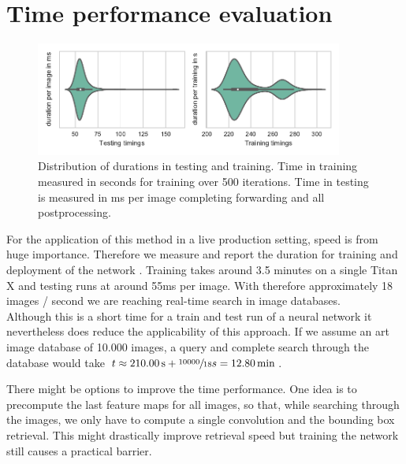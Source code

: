 \section{Time performance evaluation}
\label{sec:results:time}
\begin{figure}[h!]
  \centering
  \includegraphics[width=0.9\textwidth]{figures/timings_fig}
  \caption{Distribution of durations in testing and training. Time in training measured in seconds for training over 500 iterations. Time in testing is measured in ms per image completing forwarding and all postprocessing.}
  \label{fig:timings}
\end{figure}
For the application of this method in a live production setting, speed is from huge importance. Therefore we measure and report the duration for training and deployment of the network . Training takes around 3.5 minutes on a single Titan X and testing runs at around 55ms per image. With therefore approximately 18 images / second we are reaching real-time search in image databases.\\
Although this is a short time for a train and test run of a neural network it  nevertheless does reduce the applicability of this approach. If we assume an art image database of 10.000 images, a query and complete search through the database would take $t \approx \SI{210}{\second} + \sfrac{10000}{18}s = \SI{12.8}{\minute}$.

There might be options to improve the time performance. One idea is to precompute the last feature maps for all images, so that, while searching through the images, we only have to compute a single convolution and the bounding box retrieval. This might drastically improve retrieval speed but training the network still causes a practical barrier.

